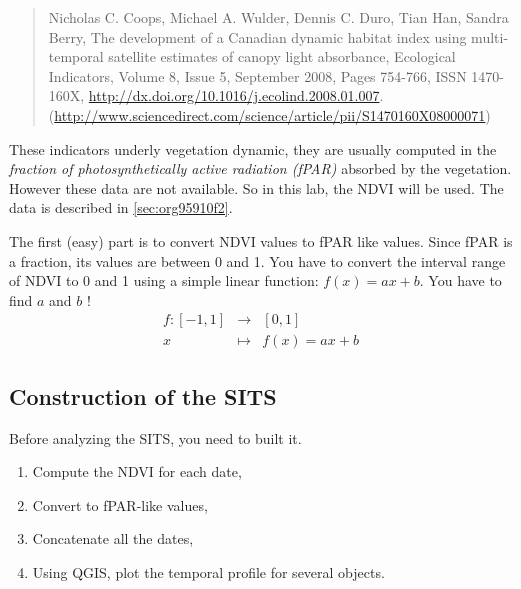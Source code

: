 \documentclass[a4paper,11pt,DIV=18]{scrartcl}
\begin{document}
\begin{quote}
Nicholas C. Coops, Michael A. Wulder, Dennis C. Duro, Tian Han, Sandra
Berry,  The development  of  a Canadian  dynamic  habitat index  using
multi-temporal  satellite   estimates  of  canopy   light  absorbance,
Ecological  Indicators,  Volume  8,  Issue 5,  September  2008,  Pages
754-766,                        ISSN                        1470-160X,
\url{http://dx.doi.org/10.1016/j.ecolind.2008.01.007}.
(\url{http://www.sciencedirect.com/science/article/pii/S1470160X08000071})
\end{quote}

These indicators underly vegetation dynamic, they are usually computed
in the \emph{fraction of photosynthetically active radiation (fPAR)} absorbed
by the vegetation.  However these data  are not available.  So in this
lab, the NDVI will be used. The data is described in \ref{sec:org95910f2}.


\begin{work}
The first (easy)  part is to convert NDVI values  to fPAR like values.
Since fPAR is a fraction, its values  are between 0 and 1. You have to
convert the interval  range of NDVI to  0 and 1 using  a simple linear
function: \(f(x)=ax+b\). You have to find \(a\) and \(b\) !
\begin{eqnarray*}
  f:[-1,1] &\to& [0,1]\\
  x&\mapsto&f(x)=ax+b
\end{eqnarray*}
\end{work}

\subsection{Construction of the SITS}
\label{sec:orgfa5ef75}
Before analyzing the  SITS, you need to built it.   
\begin{work}
\begin{enumerate}
\item Compute the NDVI for each date,
\item Convert to fPAR-like values,
\item Concatenate all the dates,
\item Using QGIS,  plot the  temporal  profile for  several objects.
\end{enumerate}
\end{work}
\end{document}
